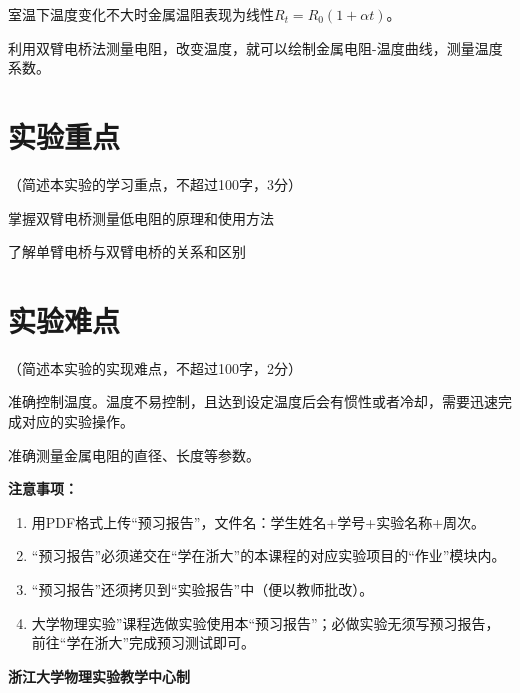\documentclass[10pt,a4paper]{ctexart}
\newcommand{\myspace}[1]{\par\vspace{#1\baselineskip}} %
\newcommand{\sihao}{\fontsize{14pt}{18pt}\selectfont}
\newcommand{\xiaosi}{\fontsize{12pt}{16pt}\selectfont}
\begin{document}
    室温下温度变化不大时金属温阻表现为线性$R_t=R_0(1+\alpha t)$。

    利用双臂电桥法测量电阻，改变温度，就可以绘制金属电阻-温度曲线，测量温度系数。
\myspace{2}
    
    \section{实验重点}
    
    \xiaosi（简述本实验的学习重点，不超过100字，3分）

掌握双臂电桥测量低电阻的原理和使用方法

了解单臂电桥与双臂电桥的关系和区别

    \myspace{2}
    
    \section{实验难点}

    \xiaosi（简述本实验的实现难点，不超过100字，2分）

    准确控制温度。温度不易控制，且达到设定温度后会有惯性或者冷却，需要迅速完成对应的实验操作。

    准确测量金属电阻的直径、长度等参数。
\myspace{2}


\newpage

\sihao\textbf{注意事项：}
\xiaosi
\begin{enumerate}
    \item 用PDF格式上传“预习报告”，文件名：学生姓名+学号+实验名称+周次。
    \item “预习报告”必须递交在“学在浙大”的本课程的对应实验项目的“作业”模块内。
    \item “预习报告”还须拷贝到“实验报告”中（便以教师批改）。
    \item 大学物理实验”课程选做实验使用本“预习报告”；必做实验无须写预习报告，前往“学在浙大”完成预习测试即可。
\end{enumerate}

\vspace{1cm}
\xiaosi\centering \textbf{浙江大学物理实验教学中心制}
\end{document}
